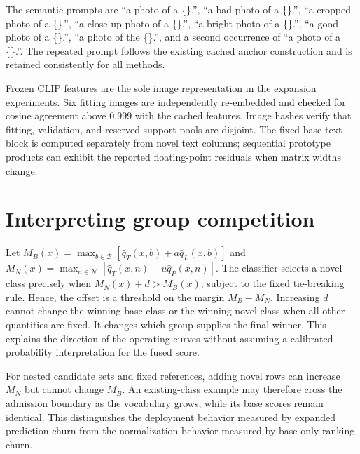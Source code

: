 \documentclass[research]{fcs}
\begin{document}
The semantic prompts are ``a photo of a \{\}.'', ``a bad photo of a \{\}.'', ``a cropped photo of a \{\}.'', ``a close-up photo of a \{\}.'', ``a bright photo of a \{\}.'', ``a good photo of a \{\}.'', ``a photo of the \{\}.'', and a second occurrence of ``a photo of a \{\}.''. The repeated prompt follows the existing cached anchor construction and is retained consistently for all methods.

Frozen CLIP features are the sole image representation in the expansion experiments. Six fitting images are independently re-embedded and checked for cosine agreement above 0.999 with the cached features. Image hashes verify that fitting, validation, and reserved-support pools are disjoint. The fixed base text block is computed separately from novel text columns; sequential prototype products can exhibit the reported floating-point residuals when matrix widths change.

\section{Interpreting group competition}
Let $M_B(x)=\max_{b\in\mathcal B}[\widehat q_T(x,b)+a\widehat q_L(x,b)]$ and $M_N(x)=\max_{n\in\mathcal N}[\widehat q_T(x,n)+u\widehat q_P(x,n)]$. The classifier selects a novel class precisely when $M_N(x)+d>M_B(x)$, subject to the fixed tie-breaking rule. Hence, the offset is a threshold on the margin $M_B-M_N$. Increasing $d$ cannot change the winning base class or the winning novel class when all other quantities are fixed. It changes which group supplies the final winner. This explains the direction of the operating curves without assuming a calibrated probability interpretation for the fused score.

For nested candidate sets and fixed references, adding novel rows can increase $M_N$ but cannot change $M_B$. An existing-class example may therefore cross the admission boundary as the vocabulary grows, while its base scores remain identical. This distinguishes the deployment behavior measured by expanded prediction churn from the normalization behavior measured by base-only ranking churn.
\end{document}
